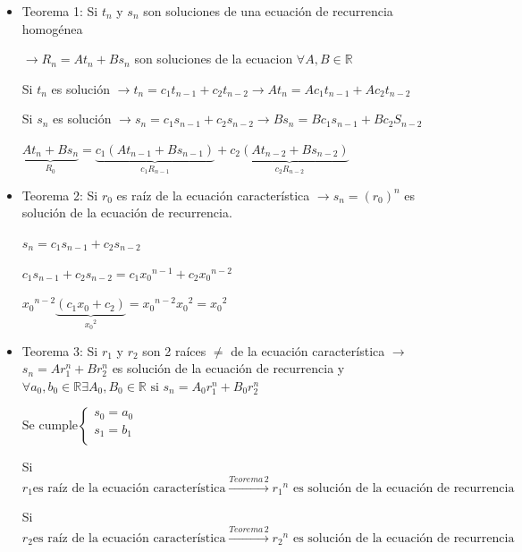 \begin{itemize}
	\item Teorema 1: Si $t_{n}$ y $s_{n}$ son soluciones de una ecuación de recurrencia homogénea 
	
	$\rightarrow R_{n} = A t_{n} + B s_{n}$ son soluciones de la ecuacion $\forall A,B \in \mathbb{R}$
	
	Si $t_{n}$ es solución $\rightarrow t_{n} = c_{1} t_{n-1} + c_{2} t_{n-2} \rightarrow A t_{n} = A c_{1} t_{n-1} + A c_{2} t_{n-2}$
	
	Si $s_{n}$ es solución $\rightarrow s_{n} = c_{1} s_{n-1} + c_{2} s_{n-2} \rightarrow B s_{n} = B c_{1} s_{n-1} + B c_{2} S_{n-2}$
	
	$\underbrace{A t_{n} + B s_{n}}_{R_{0}} = \underbrace{c_{1}(A t_{n-1} + B s_{n-1})}_{c_{1} R_{n-1}} + \underbrace{c_{2} (A t_{n-2} + B s_{n-2})}_{c_{2} R_{n-2}} $
	
	\item Teorema 2: Si $r_{0}$ es raíz de la ecuación característica $\rightarrow s_{n} = (r_{0})^{n}$ es solución de la ecuación de recurrencia.
	
	$s_{n} = c_{1} s_{n-1} + c_{2} s_{n-2}$
	
	$c_{1} s_{n-1} + c_{2} s_{n-2} = c_{1} {x_{0}}^{n-1} + c_{2} {x_{0}}^{n-2}$
	
	${x_{0}}^{n-2} \underbrace{(c_{1} x_{0} + c_{2})}_{{x_{0}}^{2}} = {x_{0}}^{n-2} {x_{0}}^{2} = {x_{0}}^{2}$
	
	\item Teorema 3: Si $r_{1}$ y $r_{2}$ son 2 raíces $\neq$ de la ecuación característica $\rightarrow$ $s_{n}=Ar_{1}^n + Br_{2}^n$
	es solución de la ecuación de recurrencia y $\forall a_{0},b_{0} \in \mathbb{R} \exists A_{0},B_{0} \in \mathbb{R} \text{ si } s_{n}=A_{0}r_{1}^n + B_{0}r_{2}^n$
	
	\begin{center}
		$\text{Se cumple} \left\{ \begin{array}{c}
		s_0 = a_0\\
		s_1 = b_1\\
		\end{array}\right.$
	\end{center}
	
	Si $r_1 \text{es raíz de la ecuación característica} \overset{Teorema\,2}{\rightarrow} {r_1}^n \text{ es solución de la ecuación de recurrencia}$
	
	Si $r_2 \text{es raíz de la ecuación característica} \overset{Teorema\,2}{\rightarrow} {r_2}^n \text{ es solución de la ecuación de recurrencia}$
	

\end{itemize}
